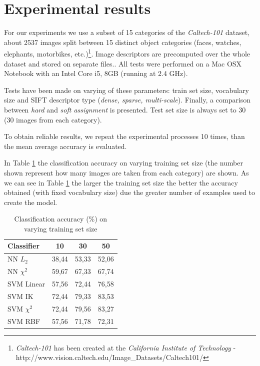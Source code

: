 \section{Experimental results}

For our experiments we use a subset of 15 categories of the \emph{Caltech-101} dataset, about 2537 images split between 15 distinct object categories (faces, watches, elephants, motorbikes, etc.)\footnote{\emph{Caltech-101} has been created at the \emph{California Institute of Technology} - http://www.vision.caltech.edu/Image\_Datasets/Caltech101/}. Image descriptors are precomputed over the whole dataset and stored on separate files.. All tests were performed on a Mac OSX Notebook with an Intel Core i5, 8GB (running at 2.4 GHz).

Tests have been made on varying of these parameters: train set size, vocabulary size and SIFT descriptor type (\emph{dense, sparse, multi-scale}). Finally, a comparison between \emph{hard} and \emph{soft assignment} is presented. Test set size is always set to 30 (30 images from each category).

To obtain reliable results, we repeat the experimental processes 10 times, than the mean average accuracy is evaluated.

In Table \ref{tab:trainsetsize} the classification accuracy on varying training set size (the number shown represent how many images are taken from each category) are shown. As we can see in Table \ref{tab:trainsetsize} the larger the training set size the better the accuracy obtained (with fixed vocabulary size) due the greater number of examples used to create the model.

\begin{table}[h]
\begin{center}
\begin{tabular}{|l|c|c|c|}
\hline
Classifier & 10 & 30 & 50\\
\hline\hline
NN $L_2$ & 38,44 & 53,33 & 52,06\\
NN $\chi^2$ & 59,67 & 67,33 & 67,74\\
SVM Linear & 57,56 & 72,44 & 76,58\\
SVM IK & 72,44 & 79,33 & 83,53\\
SVM $\chi^2$ & 72,44 & 79,56 & 83,27\\
SVM RBF & 57,56 & 71,78 & 72,31 \\
\hline
\end{tabular}
\end{center}
\label{tab:trainsetsize}
\caption{Classification accuracy (\%) on varying training set size}
\end{table}

